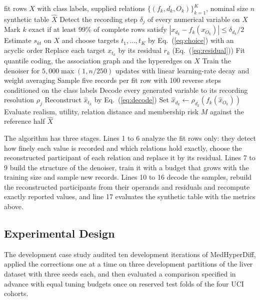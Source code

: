 \documentclass[conference]{IEEEtran}
\begin{document}
\begin{algorithm}[t]
\caption{MedHyperDiff with relation reparameterization}
\label{alg:medhyperdiff}
\small
\begin{algorithmic}[1]
\Require fit rows $X$ with class labels, supplied relations $\{(f_k, d_k, O_k)\}_{k=1}^{K}$, nominal size $n$
\Ensure synthetic table $\hat{X}$
\State Detect the recording step $\delta_j$ of every numerical variable on $X$
\State Mark $k$ exact if at least 99\% of complete rows satisfy $|x_{d_k} - f_k(x_{O_k})| \le \delta_{d_k}/2$
\EndFor
\State Estimate $s_{kt}$ on $X$ and choose targets $t_1, \dots, t_K$ by Eq.~(\ref{eq:choice}) with an acyclic order
\State Replace each target $x_{t_k}$ by its residual $r_k$ (Eq.~(\ref{eq:residual}))
\State Fit quantile coding, the association graph and the hyperedges on $X$
\State Train the denoiser for $5{,}000 \max(1, n/250)$ updates with linear learning-rate decay and weight averaging
\State Sample five records per fit row with 100 reverse steps conditioned on the class labels
\State Decode every generated variable to its recording resolution $\rho_j$
\State Reconstruct $\hat{x}_{t_k}$ by Eq.~(\ref{eq:decode})
\State Set $\hat{x}_{d_k} \gets \rho_{d_k}(f_k(\hat{x}_{O_k}))$
\EndIf
\EndFor
\State Evaluate realism, utility, relation distance and membership risk $M$ against the reference half
\State \Return $\hat{X}$
\end{algorithmic}
\end{algorithm}

The algorithm has three stages. Lines 1 to 6 analyze the fit rows only: they detect how finely each value is recorded and which relations hold exactly, choose the reconstructed participant of each relation and replace it by its residual. Lines 7 to 9 build the structure of the denoiser, train it with a budget that grows with the training size and sample new records. Lines 10 to 16 decode the samples, rebuild the reconstructed participants from their operands and residuals and recompute exactly reported values, and line 17 evaluates the synthetic table with the metrics above.

\subsection{Experimental Design}

The development case study audited ten development iterations of MedHyperDiff, applied the corrections one at a time on three development partitions of the liver dataset with three seeds each, and then evaluated a comparison specified in advance with equal tuning budgets once on reserved test folds of the four UCI cohorts.
\end{document}
